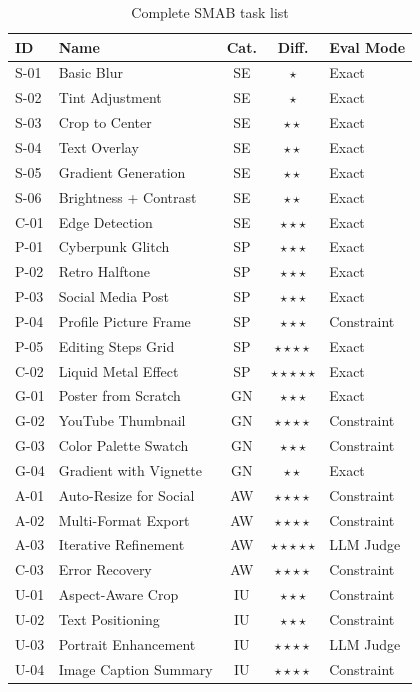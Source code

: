 \documentclass[11pt,a4paper]{article}
\begin{document}
\begin{table}[h]
\centering
\caption{Complete SMAB task list}
\label{tab:full_tasks}
\small
\begin{tabular}{llccl}
\toprule
\textbf{ID} & \textbf{Name} & \textbf{Cat.} & \textbf{Diff.} & \textbf{Eval Mode} \\
\midrule
S-01 & Basic Blur & SE & $\star$ & Exact \\
S-02 & Tint Adjustment & SE & $\star$ & Exact \\
S-03 & Crop to Center & SE & $\star\star$ & Exact \\
S-04 & Text Overlay & SE & $\star\star$ & Exact \\
S-05 & Gradient Generation & SE & $\star\star$ & Exact \\
S-06 & Brightness + Contrast & SE & $\star\star$ & Exact \\
C-01 & Edge Detection & SE & $\star\star\star$ & Exact \\
\midrule
P-01 & Cyberpunk Glitch & SP & $\star\star\star$ & Exact \\
P-02 & Retro Halftone & SP & $\star\star\star$ & Exact \\
P-03 & Social Media Post & SP & $\star\star\star$ & Exact \\
P-04 & Profile Picture Frame & SP & $\star\star\star$ & Constraint \\
P-05 & Editing Steps Grid & SP & $\star\star\star\star$ & Exact \\
C-02 & Liquid Metal Effect & SP & $\star\star\star\star\star$ & Exact \\
\midrule
G-01 & Poster from Scratch & GN & $\star\star\star$ & Exact \\
G-02 & YouTube Thumbnail & GN & $\star\star\star\star$ & Constraint \\
G-03 & Color Palette Swatch & GN & $\star\star\star$ & Constraint \\
G-04 & Gradient with Vignette & GN & $\star\star$ & Exact \\
\midrule
A-01 & Auto-Resize for Social & AW & $\star\star\star\star$ & Constraint \\
A-02 & Multi-Format Export & AW & $\star\star\star\star$ & Constraint \\
A-03 & Iterative Refinement & AW & $\star\star\star\star\star$ & LLM Judge \\
C-03 & Error Recovery & AW & $\star\star\star\star$ & Constraint \\
\midrule
U-01 & Aspect-Aware Crop & IU & $\star\star\star$ & Constraint \\
U-02 & Text Positioning & IU & $\star\star\star$ & Constraint \\
U-03 & Portrait Enhancement & IU & $\star\star\star\star$ & LLM Judge \\
U-04 & Image Caption Summary & IU & $\star\star\star\star$ & Constraint \\
\bottomrule
\end{tabular}
\end{table}
\end{document}
